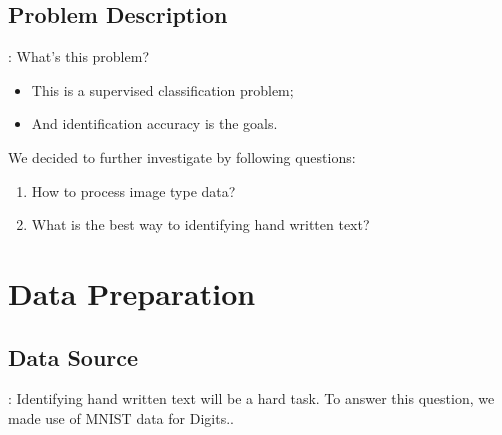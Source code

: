 \documentclass[8pt]{beamer}
\begin{document}
\subsection{Problem Description}
\begin{frame}[allowframebreaks]{\secname : \subsecname}
What's this problem?
\begin{itemize}
  \item This is a supervised classification problem;
  \item And identification accuracy is the goals.
\end{itemize}
 We decided to further investigate by following questions: 
\begin{enumerate}
  \item How to process image type data?
  \item What is the best way to identifying hand written text?
\end{enumerate}
\end{frame}



\section{Data Preparation}
\subsection{Data Source}
\begin{frame}[allowframebreaks]{\secname : \subsecname}
Identifying hand written text will be a hard task. To answer this question, we made use of MNIST data for Digits.\cite{lecun-mnisthandwrittendigit-2010}.
\end{frame}
\end{document}
